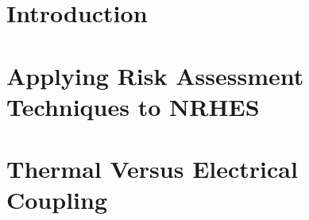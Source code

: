 \documentclass[12pt]{UIdahoMastersThesis}
\begin{document}
\mainmatter  
\setcounter{secnumdepth}{3}	%

\clearpage


\chapter{Introduction}
\label{chapter:Introduction}



\chapter{Applying Risk Assessment Techniques to NRHES}
\label{Risk}



\chapter{Thermal Versus Electrical Coupling}
\label{TvsE}

\end{document}
